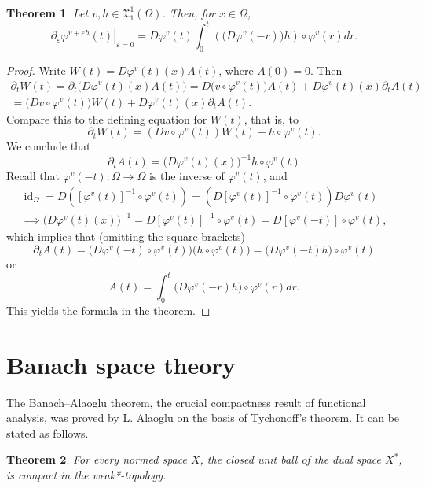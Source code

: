 \documentclass[a5paper,10pt,twoside]{article}
\newcommand{\X}{\ensuremath{\mathfrak{X}}}
\DeclareMathOperator*{\id}{id}
\theoremstyle{plain}
\newtheorem{teo}{Theorem}[section]
\theoremstyle{definition}
\theoremstyle{remark}
\begin{document}
\begin{teo}
	Let $v,h\in \X_1^1(\Omega)$. Then, for $x\in\Omega$,
	\[
	\left.\partial_\varepsilon\varphi^{v+\varepsilon h}(t)\right|_{\varepsilon=0}=D\varphi^v(t)\int_0^t\left(\big(D\varphi^v(-r)\big)h\right)\circ \varphi^v(r) dr.
	\]
\end{teo}

\begin{proof}
	Write $W(t)=D\varphi^v(t)(x)A(t)$, where $A(0)=0$. Then
	\begin{multline*}
	\partial_tW(t)=\partial_t\big(D\varphi^v(t)(x)A(t)\big)=D\big(v\circ \varphi^v(t)\big)A(t)+D\varphi^v(t)(x)\partial_tA(t)\\
	=\big(Dv\circ \varphi^v(t)\big)W(t)+D\varphi^v(t)(x)\partial_tA(t).
	\end{multline*}
	Compare this to the defining equation for $W(t)$, that is, to
	\[
	\partial_t W(t)=\left(Dv\circ \varphi^v(t)\right)W(t)+h\circ \varphi^v(t).
	\]
	We conclude that
	\[
	\partial_tA(t)=\big(D\varphi^v(t)(x)\big)^{-1}h\circ \varphi^v(t)
	\]
	Recall that $\varphi^v(-t):\Omega\to\Omega$ is the inverse of $\varphi^v(t)$, and
	\begin{multline*}
	\id_\Omega=D\left([\varphi^v(t)]^{-1}\circ\varphi^v(t)\right)=\left(D[\varphi^v(t)]^{-1}\circ \varphi^v(t)\right)D\varphi^v(t) \\
	\implies \big(D\varphi^v(t)(x)\big)^{-1}=D[\varphi^v(t)]^{-1}\circ \varphi^v(t)=D[\varphi^v(-t)]\circ \varphi^v(t),
	\end{multline*}
	which implies that (omitting the square brackets)
	\[
	\partial_tA(t)=\big(D\varphi^v(-t)\circ \varphi^v(t)\big)\big(h\circ  \varphi^v(t)\big)=\big(D\varphi^v(-t)h\big)\circ \varphi^v(t)
	\]
	or
	\[
	A(t)=\int_0^t\big(D\varphi^v(-r)h\big)\circ \varphi^v(r) dr.
	\]
	This yields the formula in the theorem.
\end{proof}




\section{Banach space theory \label{app:Banach}}
The Banach–Alaoglu theorem, the crucial compactness result of functional analysis, was proved by L. Alaoglu  on the basis of Tychonoff’s theorem. It can be stated as follows.

\begin{teo}
For every normed space $X$, the closed unit ball of the dual space $X^*$, is compact in the weak*-topology.
\end{teo}
\end{document}
